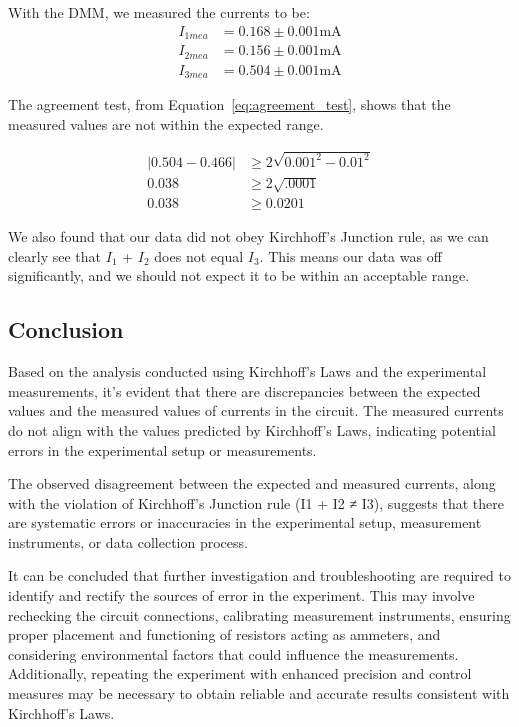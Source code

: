 \documentclass[11pt]{article}
\begin{document}
    With the DMM, we measured the currents to be:
    \begin{align*}
        I_{1mea} &= 0.168 \pm 0.001 \text{mA} \\
        I_{2mea} &= 0.156 \pm 0.001 \text{mA} \\
        I_{3mea} &= 0.504 \pm 0.001 \text{mA}
    \end{align*}

    The agreement test, from Equation~\ref{eq:agreement_test}, shows that the measured values are not within the expected range.
    \begin{e}
        \begin{align*}
            |0.504 - 0.466| &\ge 2 \sqrt{0.001^2 - 0.01^2} \\
            0.038 &\ge 2 \sqrt{.0001} \\
            0.038 &\ge 0.0201
        \end{align*}
    \end{e}

    We also found that our data did not obey Kirchhoff's Junction rule, as we can clearly see that $I_1$ + $I_2$ does not equal $I_3$.
    This means our data was off significantly, and we should not expect it to be within an acceptable range.

    \subsection{Conclusion}\label{subsec:kirchoff_conclusion}

    Based on the analysis conducted using Kirchhoff's Laws and the experimental measurements, it's evident that there are discrepancies between the expected values and the measured values of currents in the circuit. The measured currents do not align with the values predicted by Kirchhoff's Laws, indicating potential errors in the experimental setup or measurements.

    The observed disagreement between the expected and measured currents, along with the violation of Kirchhoff's Junction rule (I1 + I2 ≠ I3), suggests that there are systematic errors or inaccuracies in the experimental setup, measurement instruments, or data collection process.

    It can be concluded that further investigation and troubleshooting are required to identify and rectify the sources of error in the experiment. This may involve rechecking the circuit connections, calibrating measurement instruments, ensuring proper placement and functioning of resistors acting as ammeters, and considering environmental factors that could influence the measurements. Additionally, repeating the experiment with enhanced precision and control measures may be necessary to obtain reliable and accurate results consistent with Kirchhoff's Laws.
\end{document}
